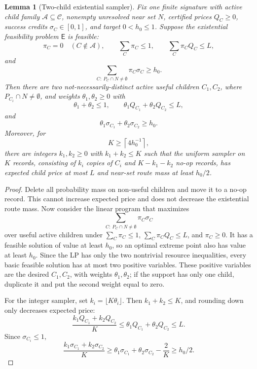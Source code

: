 \documentclass[10pt]{article}
\newtheorem{lemma}[theorem]{Lemma}
\theoremstyle{definition}
\begin{document}
\begin{lemma}[Two-child existential sampler]\label{lem:two-child-existential-sampler}
   Fix one finite signature with active child family
   \(\mathcal A\subseteq\mathcal C\), nonempty unresolved near set \(N\),
   certified prices \(Q_C\ge0\), success credits \(\sigma_C\in[0,1]\), and
   target \(0<h_0\le1\).  Suppose the existential feasibility problem
   \(\mathsf E\) is feasible:
   \[
      \pi_C=0\quad(C\notin\mathcal A),\qquad
      \sum_C\pi_C\le1,\qquad
      \sum_C\pi_CQ_C\le L,
   \]
   and
   \[
      \sum_{C:\ P_C\cap N\ne\emptyset}\pi_C\sigma_C\ge h_0 .
   \]
   Then there are two not-necessarily-distinct active useful children
   \(C_1,C_2\), where \(P_{C_i}\cap N\ne\emptyset\), and weights
   \(\theta_1,\theta_2\ge0\) with
   \[
      \theta_1+\theta_2\le1,\qquad
      \theta_1Q_{C_1}+\theta_2Q_{C_2}\le L,
   \]
   and
   \[
      \theta_1\sigma_{C_1}+\theta_2\sigma_{C_2}\ge h_0 .
   \]
   Moreover, for
   \[
      K\ge\left\lceil 4h_0^{-1}\right\rceil ,
   \]
   there are integers \(k_1,k_2\ge0\) with \(k_1+k_2\le K\) such that the
   uniform sampler on \(K\) records, consisting of \(k_i\) copies of \(C_i\)
   and \(K-k_1-k_2\) no-op records, has expected child price at most \(L\) and
   near-set route mass at least \(h_0/2\).
\end{lemma}

\begin{proof}
   Delete all probability mass on non-useful children and move it to a no-op
   record.  This cannot increase expected price and does not decrease the
   existential route mass.  Now consider the linear program that maximizes
   \[
      \sum_{C:\ P_C\cap N\ne\emptyset}\pi_C\sigma_C
   \]
   over useful active children under
   \(\sum_C\pi_C\le1\), \(\sum_C\pi_CQ_C\le L\), and \(\pi_C\ge0\).  It has a
   feasible solution of value at least \(h_0\), so an optimal extreme point also
   has value at least \(h_0\).  Since the LP has only the two nontrivial
   resource inequalities, every basic feasible solution has at most two
   positive variables.  These positive variables are the desired
   \(C_1,C_2\), with weights \(\theta_1,\theta_2\); if the support has only
   one child, duplicate it and put the second weight equal to zero.

   For the integer sampler, set \(k_i=\lfloor K\theta_i\rfloor\).  Then
   \(k_1+k_2\le K\), and rounding down only decreases expected price:
   \[
      \frac{k_1Q_{C_1}+k_2Q_{C_2}}{K}
      \le
      \theta_1Q_{C_1}+\theta_2Q_{C_2}
      \le L .
   \]
   Since \(\sigma_{C_i}\le1\),
   \[
      \frac{k_1\sigma_{C_1}+k_2\sigma_{C_2}}{K}
      \ge
      \theta_1\sigma_{C_1}+\theta_2\sigma_{C_2}-\frac2K
      \ge
      h_0/2 .
   \]
\end{proof}
\end{document}
